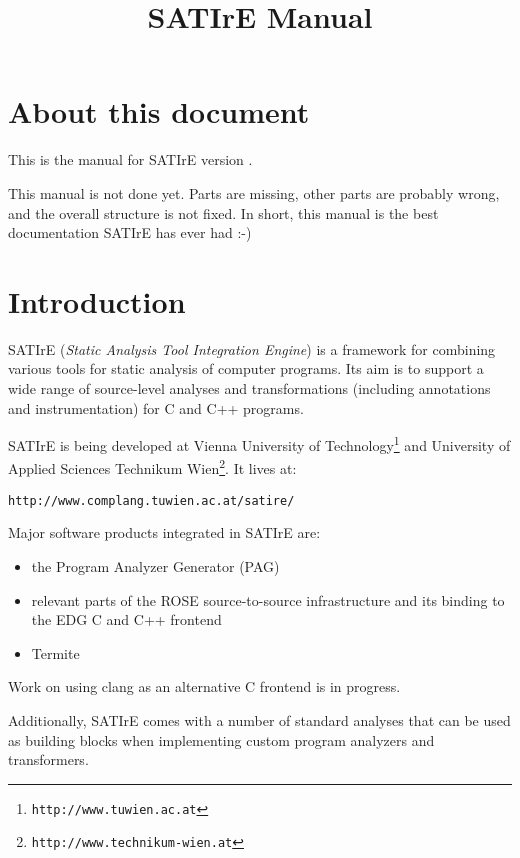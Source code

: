 \documentclass[a4paper,12pt]{report}
\title{SATIrE Manual}
\author{}
\begin{document}
\maketitle

\chapter*{About this document}

This is the manual for SATIrE version \version.

This manual is not done yet. Parts are missing, other parts are probably
wrong, and the overall structure is not fixed. In short, this manual is the
best documentation SATIrE has ever had :-)

\tableofcontents

\chapter{Introduction}
\label{chap:introduction}

SATIrE (\emph{Static Analysis Tool Integration Engine}) is a framework for
combining various tools for static analysis of computer programs. Its aim is
to support a wide range of source-level analyses and transformations
(including annotations and instrumentation) for C and C++ programs.

SATIrE is being developed at Vienna University of
Technology\footnote{\texttt{http://www.tuwien.ac.at}} and University of
Applied Sciences Technikum
Wien\footnote{\texttt{http://www.technikum-wien.at}}. It lives at:
\begin{center}
\verb|http://www.complang.tuwien.ac.at/satire/|
\end{center}

Major software products integrated in SATIrE are:
\begin{itemize}
\item the Program Analyzer Generator (PAG)
\item relevant parts of the ROSE source-to-source infrastructure and its
binding to the EDG C and C++ frontend
\item Termite
\end{itemize}

Work on using clang as an alternative C frontend is in progress.

Additionally, SATIrE comes with a number of standard analyses that can be
used as building blocks when implementing custom program analyzers and
transformers.
\end{document}
